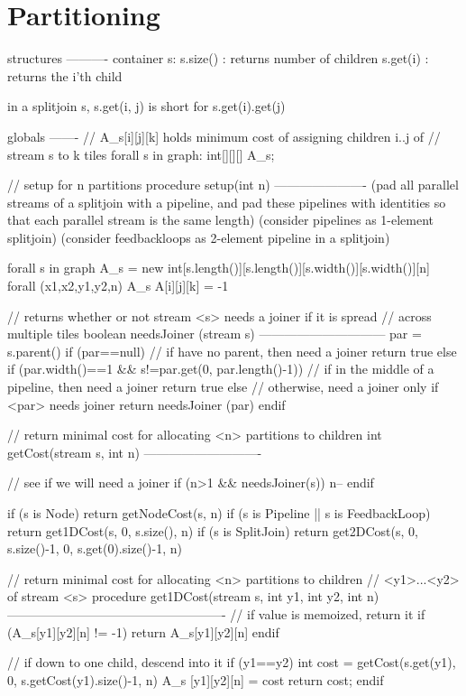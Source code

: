 \section{Partitioning}

structures
----------
container s:
  s.size()  : returns number of children
  s.get(i)  : returns the i'th child

in a splitjoin s, s.get(i, j) is short for s.get(i).get(j)

globals
-------
// A_s[i][j][k] holds minimum cost of assigning children i..j of
// stream s to k tiles
forall s in graph:  int[][][] A_s;

// setup for n partitions
procedure setup(int n) 
----------------------
(pad all parallel streams of a splitjoin with a pipeline, and pad
 these pipelines with identities so that each parallel stream is the
 same length)
(consider pipelines as 1-element splitjoin)
(consider feedbackloops as 2-element pipeline in a splitjoin)

forall s in graph
  A_s = new int[s.length()][s.length()][s.width()][s.width()][n]
  forall (x1,x2,y1,y2,n) \in A_s
    A[i][j][k] = -1

// returns whether or not stream <s> needs a joiner if it is spread
// across multiple tiles
boolean needsJoiner (stream s)
------------------------------
par = s.parent()
if (par==null)
  // if have no parent, then need a joiner
  return true
else if (par.width()==1 && s!=par.get(0, par.length()-1))
  // if in the middle of a pipeline, then need a joiner
  return true
else 
  // otherwise, need a joiner only if <par> needs joiner
  return needsJoiner (par)
endif

// return minimal cost for allocating <n> partitions to children
int getCost(stream s, int n)
----------------------------

// see if we will need a joiner
if (n>1 && needsJoiner(s)) 
  n--
endif

if (s is Node)
 return getNodeCost(s, n)
if (s is Pipeline || s is FeedbackLoop)
 return get1DCost(s, 0, s.size(), n)
if (s is SplitJoin)
 return get2DCost(s, 0, s.size()-1, 0, s.get(0).size()-1, n)

// return minimal cost for allocating <n> partitions to children
// <y1>...<y2> of stream <s>
procedure get1DCost(stream s, int y1, int y2, int n)
----------------------------------------------------
// if value is memoized, return it
if (A_s[y1][y2][n] != -1)
  return A_s[y1][y2][n]
endif

// if down to one child, descend into it
if (y1==y2)
  int cost = getCost(s.get(y1), 0, s.getCost(y1).size()-1, n)
  A_s [y1][y2][n] = cost
  return cost;
endif

